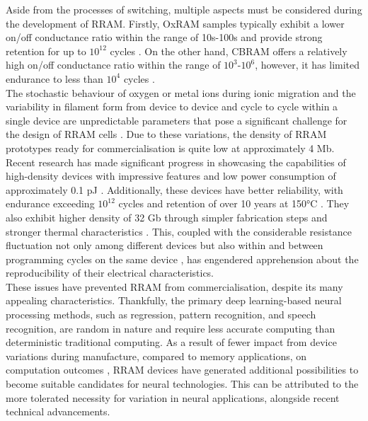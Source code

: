\noindent Aside from the processes of switching, multiple aspects must be considered during the development of RRAM. Firstly, OxRAM samples typically exhibit a lower on/off conductance ratio within the range of 10s-100s and provide strong retention for up to $10^{12}$ cycles \cite{ielmini2010resistance}. On the other hand, CBRAM offers a relatively high on/off conductance ratio within the range of $10^3$-$10^6$, however, it has limited endurance to less than $10^4$ cycles \cite{ambrogio2014statistical1}. \\

\noindent The stochastic behaviour of oxygen or metal ions during ionic migration and the variability in filament form from device to device and cycle to cycle within a single device are unpredictable parameters that pose a significant challenge for the design of RRAM cells \cite{ambrogio2014statistical2}. Due to these variations, the density of RRAM prototypes ready for commercialisation is quite low at approximately 4 Mb. \\

\noindent Recent research has made significant progress in showcasing the capabilities of high-density devices with impressive features and low power consumption of approximately 0.1 pJ \cite{yang2013memristive}. Additionally, these devices have better reliability, with endurance exceeding $10^12$ cycles and retention of over 10 years at 150°C \cite{hu2014review}. They also exhibit higher density of 32 Gb through simpler fabrication steps and stronger thermal characteristics \cite{cha2013nanoscale}. This, coupled with the considerable resistance fluctuation not only among different devices but also within and between programming cycles on the same device \cite{moore2006lithography}, has engendered apprehension about the reproducibility of their electrical characteristics. \\

\noindent  These issues have prevented RRAM from commercialisation, despite its many appealing characteristics. Thankfully, the primary deep learning-based neural processing methods, such as regression, pattern recognition, and speech recognition, are random in nature and require less accurate computing than deterministic traditional computing. As a result of fewer impact from device variations during manufacture, compared to memory applications, on computation outcomes \cite{malik2013governing}, RRAM devices have generated additional possibilities to become suitable candidates for neural technologies. This can be attributed to the more tolerated necessity for variation in neural applications, alongside recent technical advancements.


